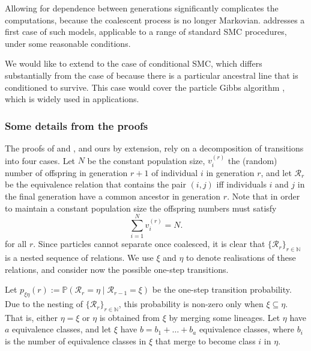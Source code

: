 \documentclass{article}
\newcommand{\PR}{\mathbb{P}}
\begin{document}
Allowing for dependence between generations significantly complicates the computations, because the coalescent process is no longer Markovian. \citet{koskela2018} addresses a first case of such models, applicable to a range of standard SMC procedures, under some reasonable conditions.

We would like to extend to the case of conditional SMC, which differs substantially from the case of \citet{koskela2018} because there is a particular ancestral line that is conditioned to survive. This case would cover the particle Gibbs algorithm \citep{andrieu2010}, which is widely used in applications.

\subsubsection{Some details from the proofs}
The proofs of \citet{mohle1998} and \citet{koskela2018}, and ours by extension, rely on a decomposition of transitions into four cases.
Let $N$ be the constant population size, $v_i^{(r)}$ the (random) number of offspring in generation $r+1$ of individual $i$ in generation $r$, and let $\mathcal{R}_r$ be the equivalence relation that contains the pair $(i,j)$ iff individuals $i$ and $j$ in the final generation have a common ancestor in generation $r$. 
Note that in order to maintain a constant population size the offspring numbers must satisfy
\begin{equation}\label{eq:sum_vi}
\sum_{i=1}^{N} v_i^{(r)} = N.
\end{equation}
for all $r$.
Since particles cannot separate once coalesced, it is clear that $\{\mathcal{R}_r\}_{r \in \mathbb{N}}$ is a nested sequence of relations.
We use $\xi$ and $\eta$ to denote realisations of these relations, and consider now the possible one-step transitions.

Let $p_{\xi\eta}(r) := \PR(\mathcal{R}_r=\eta\mid\mathcal{R}_{r-1}=\xi)$ be the one-step transition probability. Due to the nesting of $\{\mathcal{R}_r\}_{r \in \mathbb{N}}$, this probability is non-zero only when $\xi \subseteq \eta$. That is, either $\eta=\xi$ or $\eta$ is obtained from $\xi$ by merging some lineages.
Let $\eta$ have $a$ equivalence classes, and let $\xi$ have $b = b_1 + \dots + b_a$ equivalence classes, where $b_i$ is the number of equivalence classes in $\xi$ that merge to become class $i$ in $\eta$.
\end{document}
